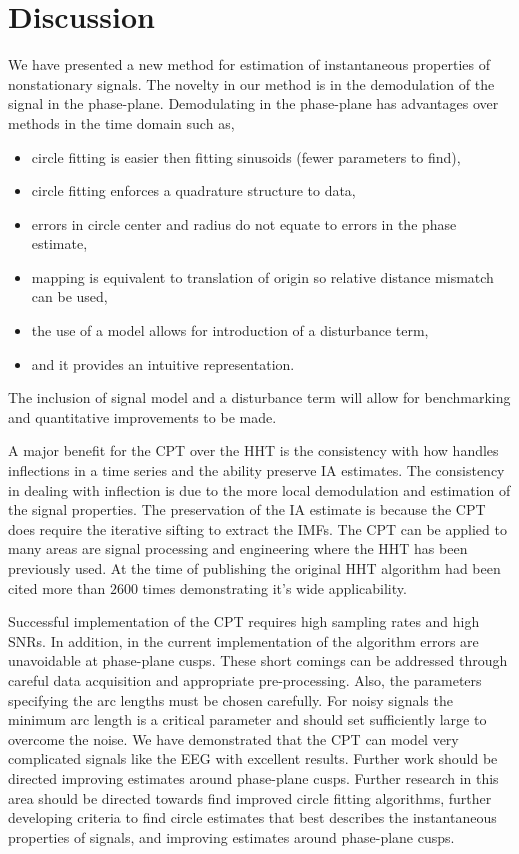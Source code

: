 \documentclass[a4paper]{IEEEtran}
\begin{document}
\section{Discussion}\label{sect:DiscussionSection}
We have presented a new method for estimation of instantaneous properties of nonstationary signals. The novelty in our method is in the demodulation of the signal in the phase-plane. Demodulating in the phase-plane has advantages over methods in the time domain such as, 
\begin{itemize}
    \item circle fitting is easier then fitting sinusoids (fewer parameters to find),
    \item circle fitting enforces a quadrature structure to data,
    \item errors in circle center and radius do not equate to errors in the phase estimate,
    \item mapping is equivalent to translation of origin so relative distance mismatch can be used,
    \item the use of a model allows for introduction of a disturbance term,
    \item and it provides an intuitive representation.
\end{itemize}
The inclusion of signal model and a disturbance term will allow for benchmarking and quantitative improvements to be made.

A major benefit for the CPT over the HHT is the consistency with how handles inflections in a time series and the ability preserve IA estimates. The consistency in dealing with inflection is due to the more local demodulation and estimation of the signal properties. The preservation of the IA estimate is because the CPT does require the iterative sifting to extract the IMFs. The CPT can be applied to many areas are signal processing and engineering where the HHT has been previously used. At the time of publishing the original HHT algorithm had been cited more than $2600$ times demonstrating it's wide applicability.

Successful implementation of the CPT requires high sampling rates and high SNRs. In addition, in the current implementation of the algorithm errors are unavoidable at phase-plane cusps. These short comings can be addressed through careful data acquisition and appropriate pre-processing. Also, the parameters specifying the arc lengths must be chosen carefully. For noisy signals the minimum arc length is a critical parameter and should set sufficiently large to overcome the noise. We have demonstrated that the CPT can model very complicated signals like the EEG with excellent results. Further work should be directed improving estimates around phase-plane cusps.
Further research in this area should be directed towards find improved circle fitting algorithms, further developing criteria to find circle estimates that best describes the instantaneous properties of signals, and improving estimates around phase-plane cusps.
\end{document}
